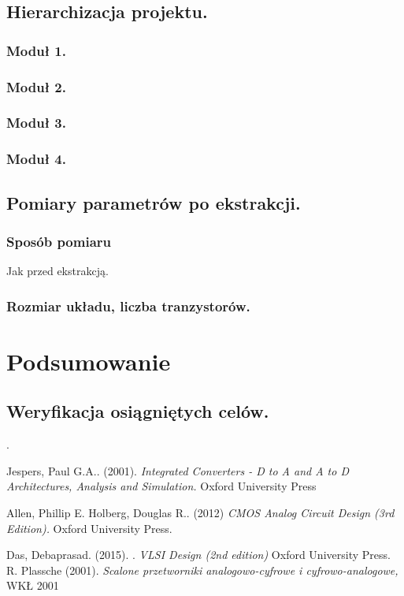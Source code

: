 \documentclass[10pt,a4paper]{report}
\begin{document}
	\section{Hierarchizacja projektu.}
	\subsection{Moduł 1.}
	\subsection{Moduł 2.}
	\subsection{Moduł 3.}
	\subsection{Moduł 4.}
	
	\section{Pomiary parametrów po ekstrakcji.}
	\subsection{Sposób pomiaru}
	Jak przed ekstrakcją.
	\subsection{Rozmiar układu, liczba tranzystorów.}

	\chapter{Podsumowanie}
	\section{Weryfikacja osiągniętych celów.}
	
	
	\appendix
.
	\begin{thebibliography}{9}
		Jespers, Paul G.A.. (2001). 
		\textit{Integrated Converters - D to A and A to D Architectures, Analysis and Simulation.}
		Oxford University Press
		
		Allen, Phillip E. Holberg, Douglas R.. (2012)  
		\textit{CMOS Analog Circuit Design (3rd Edition). }
		Oxford University Press.
		
		Das, Debaprasad. (2015). .
		\textit{VLSI Design (2nd edition)}
		Oxford University Press.
		R. Plassche (2001). 
		\textit{Scalone przetworniki analogowo-cyfrowe i cyfrowo-analogowe,}
		WKŁ 2001
	\end{thebibliography}
\end{document}
